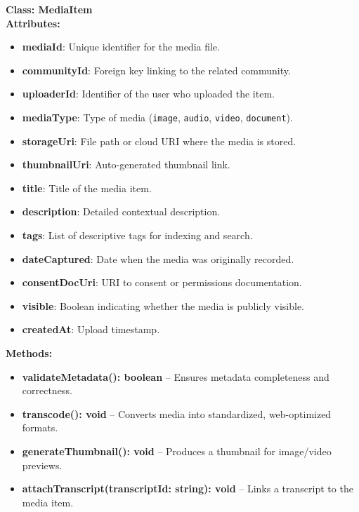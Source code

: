 \bigskip
\textbf{Class: MediaItem}\\
\textbf{Attributes:}
\begin{itemize}
    \item \textbf{mediaId}: Unique identifier for the media file.
    \item \textbf{communityId}: Foreign key linking to the related community.
    \item \textbf{uploaderId}: Identifier of the user who uploaded the item.
    \item \textbf{mediaType}: Type of media (\texttt{image}, \texttt{audio}, \texttt{video}, \texttt{document}).
    \item \textbf{storageUri}: File path or cloud URI where the media is stored.
    \item \textbf{thumbnailUri}: Auto-generated thumbnail link.
    \item \textbf{title}: Title of the media item.
    \item \textbf{description}: Detailed contextual description.
    \item \textbf{tags}: List of descriptive tags for indexing and search.
    \item \textbf{dateCaptured}: Date when the media was originally recorded.
    \item \textbf{consentDocUri}: URI to consent or permissions documentation.
    \item \textbf{visible}: Boolean indicating whether the media is publicly visible.
    \item \textbf{createdAt}: Upload timestamp.
\end{itemize}

\textbf{Methods:}
\begin{itemize}
    \item \textbf{validateMetadata(): boolean} -- Ensures metadata completeness and correctness.
    \item \textbf{transcode(): void} -- Converts media into standardized, web-optimized formats.
    \item \textbf{generateThumbnail(): void} -- Produces a thumbnail for image/video previews.
    \item \textbf{attachTranscript(transcriptId: string): void} -- Links a transcript to the media item.
\end{itemize}



